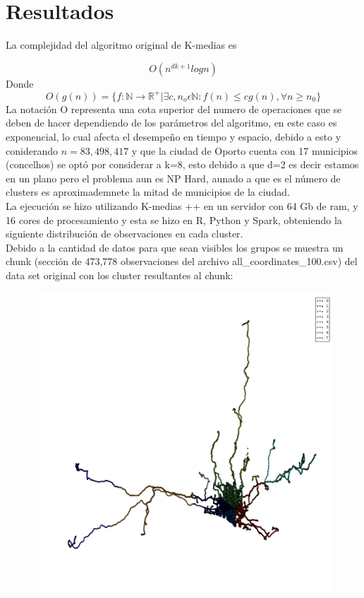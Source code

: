 \documentclass[a4paper]{article}
\begin{document}
\section{Resultados}

La complejidad del algoritmo original de K-medias es

\begin{displaymath}
O(n^{dk+1}log n)
\end{displaymath}
Donde 
\begin{displaymath}
O(g(n)) = \{ f: \mathbb{N} \to \mathbb{R}^+ | \exists c , n_o \epsilon \mathbb{N}:f(n)\leq cg(n), \forall n\geq n_0 \}
\end{displaymath}
La notación O representa una cota superior del numero de operaciones que se deben de hacer dependiendo de los parámetros del algoritmo, en este caso es exponencial, lo cual afecta el desempeño en tiempo y espacio, debido a esto  y coniderando $n=83,498,417$  y que la ciudad de Oporto cuenta con 17 municipios (concelhos) se optó por considerar a k=8, esto debido a que d=2 es decir estamos en un plano pero el problema aun  es NP Hard, aunado a que es el número de clusters es aproximademnete la mitad de municipios de la ciudad.\\


\noindent
La ejecución se hizo utilizando K-medias ++ en un servidor con 64 Gb de ram, y 16 cores de procesamiento y esta se hizo en R, Python y Spark, obteniendo la siguiente distribuci\'on de observaciones en cada cluster.\\

\noindent
Debido a la cantidad de datos para que sean visibles los grupos se muestra un chunk  (sección de 473,778 observaciones del archivo all\_coordinates\_100.csv) del data set original con los cluster resultantes al chunk:
\begin{figure}[H]
\includegraphics[scale=.3]{descarga_1.png}
\end{figure}
\end{document}
